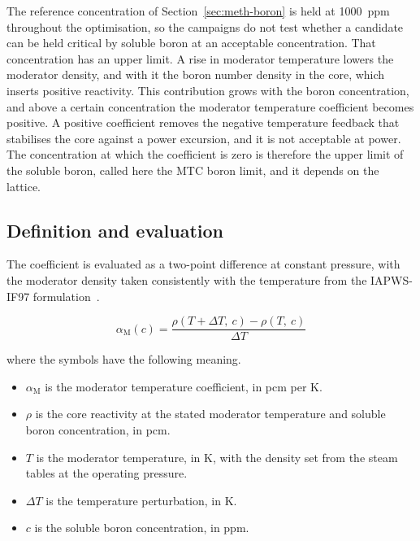 The reference concentration of Section~\ref{sec:meth-boron} is held at
\SI{1000}{ppm} throughout the optimisation, so the campaigns do not test
whether a candidate can be held critical by soluble boron at an
acceptable concentration. That concentration has an upper limit. A rise
in moderator temperature lowers the moderator density, and with it the
boron number density in the core, which inserts positive reactivity.
This contribution grows with the boron concentration, and above a
certain concentration the moderator temperature coefficient becomes
positive. A positive coefficient removes the negative temperature
feedback that stabilises the core against a power excursion, and it is
not acceptable at power. The concentration at which the coefficient is
zero is therefore the upper limit of the soluble boron, called here the
MTC boron limit, and it depends on the lattice.

\subsection{Definition and evaluation}
\label{sec:meth-mtc-def}

The coefficient is evaluated as a two-point difference at constant
pressure, with the moderator density taken consistently with the
temperature from the IAPWS-IF97 formulation~\cite{wagner_iapws_if97_2000}.

\begin{equation}
\alpha_\mathrm{M}(c) = \frac{\rho\!\left(T + \Delta T,\ c\right)
- \rho\!\left(T,\ c\right)}{\Delta T}
\label{eq:mtc}
\end{equation}

\noindent where the symbols have the following meaning.

\begin{itemize}
  \item $\alpha_\mathrm{M}$ is the moderator temperature coefficient, in
        pcm per K.
  \item $\rho$ is the core reactivity at the stated moderator temperature
        and soluble boron concentration, in pcm.
  \item $T$ is the moderator temperature, in K, with the density set from
        the steam tables at the operating pressure.
  \item $\Delta T$ is the temperature perturbation, in K.
  \item $c$ is the soluble boron concentration, in ppm.
\end{itemize}

